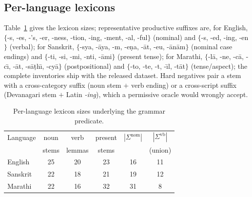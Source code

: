 \documentclass[journal]{IEEEtran}
\begin{document}
\subsection{Per-language lexicons}
Table~\ref{tab:lexicon} gives the lexicon sizes; representative productive
suffixes are, for English, $\{$-s, -es, -'s, -er, -ness, -tion, -ing, -ment,
-al, -ful$\}$ (nominal) and $\{$-s, -ed, -ing, -en$\}$ (verbal); for Sanskrit,
$\{$-sya, -\={a}ya, -m, -e\d{n}a, -\={a}t, -eu, -\={a}n\={a}m$\}$ (nominal case
endings) and $\{$-ti, -si, -mi, -nti, -\={a}mi$\}$ (present tense); for Marathi,
$\{$-l\={a}, -ne, -c\={a}, -c\={\i}, -\={a}t, -s\={a}\d{t}h\={\i}, -cy\={a}$\}$
(postpositional) and $\{$-to, -te, -t, -\={\i}l, -t\={a}t$\}$ (tense/aspect); the
complete inventories ship with the released dataset. Hard negatives pair a stem
with a cross-category suffix (noun stem $+$ verb ending) or a cross-script suffix
(Devanagari stem $+$ Latin \emph{-ing}), which a permissive oracle would wrongly
accept.

\begin{table}[t]
\centering
\caption{Per-language lexicon sizes underlying the grammar predicate.}
\label{tab:lexicon}
\small
\begin{tabular}{@{}lccccc@{}}
\toprule
Language & noun & verb & present & $|\Sigma^{\mathrm{nom}}|$ & $|\Sigma^{\mathrm{vb}}|$ \\
         & stems & lemmas & stems & & (union) \\
\midrule
English  & 25 & 20 & 23 & 16 & 11 \\
Sanskrit & 22 & 18 & 21 & 19 & 12 \\
Marathi  & 22 & 16 & 32 & 31 & 8 \\
\bottomrule
\end{tabular}
\end{table}



\end{document}
